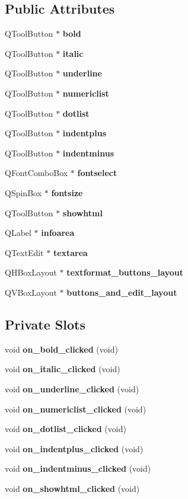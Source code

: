 \subsection*{Public Attributes}
\begin{CompactItemize}
\item 
QTool\-Button $\ast$ {\bf bold}
\item 
QTool\-Button $\ast$ {\bf italic}
\item 
QTool\-Button $\ast$ {\bf underline}
\item 
QTool\-Button $\ast$ {\bf numericlist}
\item 
QTool\-Button $\ast$ {\bf dotlist}
\item 
QTool\-Button $\ast$ {\bf indentplus}
\item 
QTool\-Button $\ast$ {\bf indentminus}
\item 
QFont\-Combo\-Box $\ast$ {\bf fontselect}
\item 
QSpin\-Box $\ast$ {\bf fontsize}
\item 
QTool\-Button $\ast$ {\bf showhtml}
\item 
QLabel $\ast$ {\bf infoarea}
\item 
QText\-Edit $\ast$ {\bf textarea}
\item 
QHBox\-Layout $\ast$ {\bf textformat\_\-buttons\_\-layout}
\item 
QVBox\-Layout $\ast$ {\bf buttons\_\-and\_\-edit\_\-layout}
\end{CompactItemize}
\subsection*{Private Slots}
\begin{CompactItemize}
\item 
void {\bf on\_\-bold\_\-clicked} (void)
\item 
void {\bf on\_\-italic\_\-clicked} (void)
\item 
void {\bf on\_\-underline\_\-clicked} (void)
\item 
void {\bf on\_\-numericlist\_\-clicked} (void)
\item 
void {\bf on\_\-dotlist\_\-clicked} (void)
\item 
void {\bf on\_\-indentplus\_\-clicked} (void)
\item 
void {\bf on\_\-indentminus\_\-clicked} (void)
\item 
void {\bf on\_\-showhtml\_\-clicked} (void)
\end{CompactItemize}
